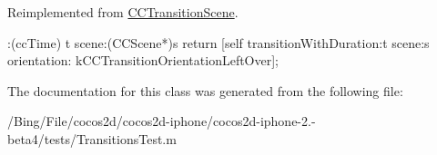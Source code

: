 Reimplemented from \hyperlink{interface_c_c_transition_scene_af49d7862a7560b4b4954dda1363cfa28}{C\-C\-Transition\-Scene}.


\begin{DoxyCode}
                            :(ccTime) t scene:(CCScene*)s {
        return [self transitionWithDuration:t scene:s orientation:
      kCCTransitionOrientationLeftOver];
}
\end{DoxyCode}


The documentation for this class was generated from the following file\-:\begin{DoxyCompactItemize}
\item 
/\-Bing/\-File/cocos2d/cocos2d-\/iphone/cocos2d-\/iphone-\/2.-\/beta4/tests/Transitions\-Test.\-m\end{DoxyCompactItemize}
